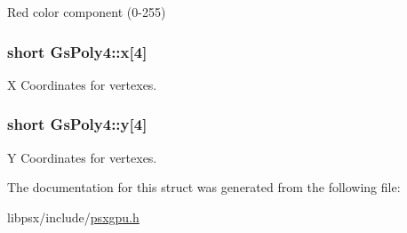 Red color component (0-\/255) 

\hypertarget{structGsPoly4_a8fc65921b04745ae353e3c84b5100e0e}{}
\subsubsection[{x}]{\setlength{\rightskip}{0pt plus 5cm}short Gs\+Poly4\+::x\mbox{[}4\mbox{]}}\label{structGsPoly4_a8fc65921b04745ae353e3c84b5100e0e}


X Coordinates for vertexes. 

\hypertarget{structGsPoly4_ac3ac9fb14ed1df2858808b4de7981cd4}{}
\subsubsection[{y}]{\setlength{\rightskip}{0pt plus 5cm}short Gs\+Poly4\+::y\mbox{[}4\mbox{]}}\label{structGsPoly4_ac3ac9fb14ed1df2858808b4de7981cd4}


Y Coordinates for vertexes. 



The documentation for this struct was generated from the following file\+:\begin{DoxyCompactItemize}
\item 
libpsx/include/\hyperlink{psxgpu_8h}{psxgpu.\+h}\end{DoxyCompactItemize}
